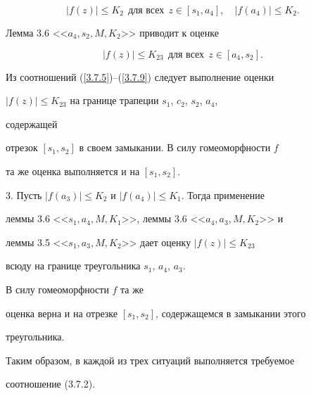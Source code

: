 \begin{pf}
\begin{equation}
\label{3.7.8}


|f(z)|\leq K_2 \ \ \text{для всех} \ \ z\in [s_1, a_4],


\quad |f(a_4)|\leq K_2. 


\end{equation}


Лемма 3.6 <<$a_4, s_2, M, K_2$>> приводит к оценке


\begin{equation}


\label{3.7.9}


|f(z)|\leq K_{23} \ \ \text{для всех} \ \ z\in [a_4, s_2].


\end{equation}


Из соотношений (\ref{3.7.5})--(\ref{3.7.9}) следует выполнение оценки 


$|f(z)|\leq K_{23}$ на границе трапеции $s_1$, $c_2$, $s_2$, $a_4$,


содержащей 


отрезок $[s_1, s_2]$ в своем замыкании. В силу гомеоморфности $f$ 


та же оценка выполняется и на $[s_1, s_2]$. 


\smallskip





3. Пусть $|f(a_3)|\leq K_2$ и $|f(a_4)|\leq K_1$. Тогда применение 


леммы 3.6 <<$s_1, a_4, M, K_1$>>, леммы 3.6 <<$a_4, a_3, M, K_2$>> и 


леммы 3.5 <<$s_1, a_3, M, K_2$>> дает оценку $|f(z)|\leq K_{23}$ 


всюду на границе треугольника $s_1$, $a_4$, $a_3$.


В силу гомеоморфности $f$ та же 


оценка верна и на отрезке $[s_1, s_2]$, содержащемся в замыкании этого 


треугольника.





Таким образом, в каждой из трех ситуаций выполняется требуемое 


соотношение (3.7.2).


\end{pf}





